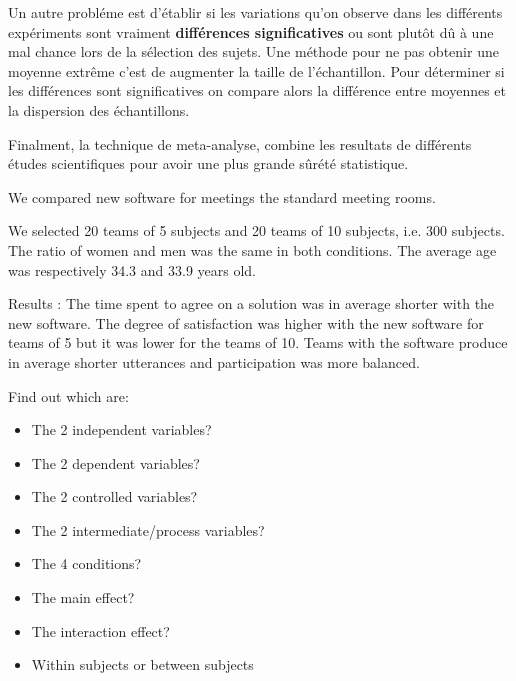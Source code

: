\begin{itemize}
Un autre probl\'eme est d'\'etablir si les variations qu'on observe dans les diff\'erents exp\'eriments sont vraiment \textbf{diff\'erences significatives} ou sont plut\^ot d\^u \`a une mal chance lors de la s\'election des sujets. Une m\'ethode pour ne pas obtenir une moyenne extr\^eme c'est de augmenter la taille de l'\'echantillon. Pour d\'eterminer si les diff\'erences sont significatives on compare alors la diff\'erence entre moyennes et la dispersion des \'echantillons.

Finalment, la technique de meta-analyse, combine les resultats de diff\'erents \'etudes scientifiques  pour avoir une plus grande s\^ur\'et\'e statistique.
\end{itemize}

\begin{exercise}
We compared new software for meetings the standard meeting rooms.

We selected 20 teams of 5 subjects and 20 teams of 10 subjects, i.e. 300 subjects. The ratio of women and men was the same in both conditions. The average age was respectively 34.3 and 33.9 years old.

Results : The time spent to agree on a solution was in average shorter with the new software. The degree of satisfaction was higher with the new software for teams of 5 but it was lower for the teams of 10. Teams
with the software produce in average shorter utterances and  participation was more balanced.

Find out which are:

\begin{itemize}
\item The 2 independent variables?
\item The 2 dependent variables?
\item The 2 controlled variables?
\item The 2 intermediate/process variables?
\item The 4 conditions?
\item The main effect?
\item The interaction effect?
\item Within subjects or between subjects
\end{itemize}
\end{exercise}

